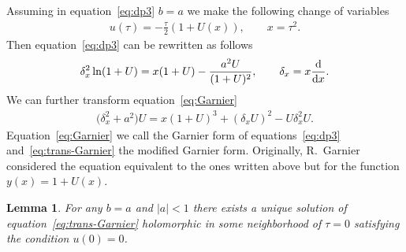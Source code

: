\documentclass[pdftex]{sigma}
\numberwithin{equation}{section}
\newtheorem{Lemma}[Theorem]{Lemma}
\begin{document}
Assuming in equation~\eqref{eq:dp3} $b=a$ we make the following change of variables
\begin{gather}\label{eq:U-x}
u(\tau)=-\frac{\tau}2\left(1+U(x)\right),\qquad x=\tau^2.
\end{gather}
Then equation~\eqref{eq:dp3} can be rewritten as follows
\begin{gather}\label{eq:Garnier}
\delta_x^2\ln(1+U)=x(1+U)-\frac{a^2U}{(1+U)^2},\qquad \delta_x=x\frac{{\rm d}}{{\rm d}x}.
\end{gather}
We can further transform equation~\eqref{eq:Garnier}
\begin{gather}\label{eq:trans-Garnier}
\big(\delta_x^2+a^2\big)U=x(1+U)^3+(\delta_xU)^2-U\delta_x^2U.
\end{gather}
Equation~\eqref{eq:Garnier} we call the Garnier form of equations~\eqref{eq:dp3} and~\eqref{eq:trans-Garnier}
the modified Garnier form. Originally, R.~Garnier considered the equation equivalent to the ones written above
but for the function $y(x)=1+U(x)$.
\begin{Lemma}\label{lem:existence&uniqueness}
For any $b=a$ and $|a|<1$ there exists a unique solution of equation~\eqref{eq:trans-Garnier} holomorphic in some
neighborhood of $\tau=0$ satisfying the condition $u(0)=0$.
\end{Lemma}
\end{document}

